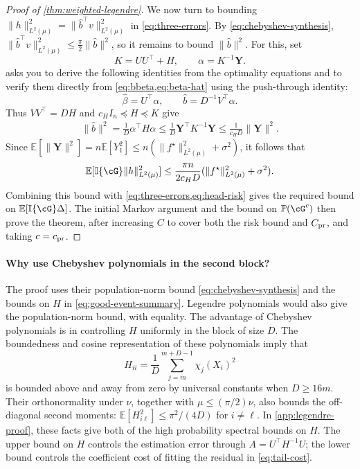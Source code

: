 \documentclass[11pt,twoside]{article}
\newcommand{\E}{\mathbb E}
\newcommand{\I}{\mathbb I}
\newcommand{\one}[1]{\I\{#1\}}
\renewcommand{\P}{\mathbb P}
\theoremstyle{definition}
\theoremstyle{remark}
\begin{document}
\begin{proof}[Proof of \cref{thm:weighted-legendre}]
We now turn to bounding $\|h\|_{L^2(\mu)}^2 = \| \widehat b^\top v \|_{L^2(\mu)}^2$ in
 \cref{eq:three-errors}.
By  \cref{eq:chebyshev-synthesis}, 
$\| \widehat b^\top v \|_{L^2(\mu)}^2 \le \frac\pi2\|\widehat b\|^2$, so it remains
to bound $\|\widehat b\|^2$.
For this, set
\[
K=UU^\top+H,\qquad \alpha=K^{-1}\mathbf Y.
\]
 asks you to derive the following identities from
the optimality equations and to verify them directly from
\cref{eq:bbeta,eq:beta-hat} using the push-through identity:
\[
 \widehat\beta=U^\top\alpha,
 \qquad \widehat b=D^{-1}V^\top\alpha.
\]
Thus $VV^\top=DH$ and $c_HI_n\preceq H\preceq K$ give
\begin{align}
\|\widehat b\|^2
 =\frac{1}{D}\alpha^\top H\alpha
 \le\frac{1}{D}\mathbf Y^\top K^{-1}\mathbf Y
 \le\frac{1}{c_HD}\|\mathbf Y\|^2.
 \label{eq:tail-cost}
\end{align}
Since
$
 \E[\|\mathbf Y\|^2]
 =n\E[Y_1^2]
 \le n(\|f^\star\|_{L^2(\mu)}^2+\sigma^2)$,
it follows that
\[
 \E[\I\{\cG\}\|h\|_{L^2(\mu)}^2]
 \le\frac{\pi n}{2c_HD}
       (\|f^\star\|_{L^2(\mu)}^2+\sigma^2).
\]
Combining this bound with \cref{eq:three-errors,eq:head-risk} gives the
required bound on $\E[\one{\cG}\Delta]$. The initial Markov argument and
the bound on $\P(\cG^c)$ then prove the theorem, after increasing $C$ to
cover both the risk bound and $C_{\rm pr}$, and taking $c=c_{\rm pr}$.
\end{proof}

\paragraph{Why use Chebyshev polynomials in the second block?}
The proof uses their population-norm bound
\cref{eq:chebyshev-synthesis} and the bounds on $H$ in
\cref{eq:good-event-summary}. Legendre polynomials would also give the
population-norm bound, with equality. The advantage of Chebyshev
polynomials is in controlling $H$ uniformly in the block of size $D$.
The boundedness and cosine representation of these polynomials imply that
\[
 H_{ii}=\frac1D\sum_{j=m}^{m+D-1}\chi_j(X_i)^2
\]
is bounded above and away from zero by universal constants when
$D\ge16m$. Their orthonormality under $\nu$, together with
$\mu\le(\pi/2)\nu$, also bounds the off-diagonal second moments:
$\E[H_{i\ell}^2]\le \pi^2/(4D)$ for $i\ne\ell$.
In \cref{app:legendre-proof}, these facts give both of the 
high probability
spectral bounds on
$H$. %
The upper bound on $H$ controls the estimation error through
$A=U^\top H^{-1}U$; the lower bound controls the coefficient cost of
fitting the residual in \cref{eq:tail-cost}.
\end{document}
